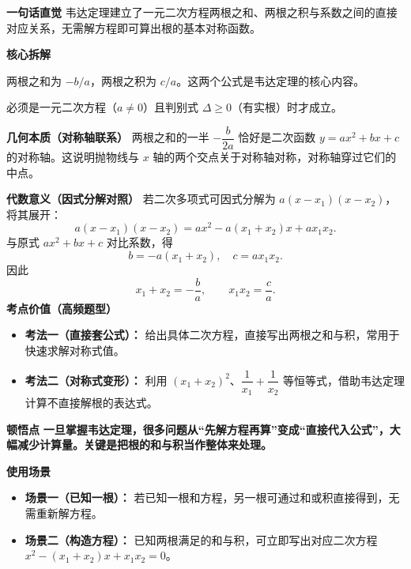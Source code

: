 \begin{explanationbox}
	\textbf{\textcolor{CExplanation}{一句话直觉}}
	韦达定理建立了一元二次方程两根之和、两根之积与系数之间的直接对应关系，无需解方程即可算出根的基本对称函数。

	\medskip
	\textbf{\textcolor{CExplanation}{核心拆解}}
	\begin{description}[style=nextline, leftmargin=2.8em, labelsep=0.5em, itemsep=0.45em]
		\item[\textbf{要点一（和积公式）：}]
			两根之和为 $-b/a$，两根之积为 $c/a$。这两个公式是韦达定理的核心内容。
		\item[\textbf{要点二（使用前提）：}]
			必须是一元二次方程（$a\neq 0$）且判别式 $\Delta\geq 0$（有实根）时才成立。
	\end{description}

	\medskip
	\textbf{\textcolor{CExplanation}{几何本质（对称轴联系）}}
	两根之和的一半 $-\dfrac{b}{2a}$ 恰好是二次函数 $y=ax^2+bx+c$ 的对称轴。这说明抛物线与 $x$ 轴的两个交点关于对称轴对称，对称轴穿过它们的中点。

	\medskip
	\textbf{\textcolor{CExplanation}{代数意义（因式分解对照）}}
	若二次多项式可因式分解为 $a(x-x_1)(x-x_2)$，将其展开：
	\[
		a(x-x_1)(x-x_2)=ax^2-a(x_1+x_2)x+a x_1x_2.
	\]
	与原式 $ax^2+bx+c$ 对比系数，得
	\[
		b=-a(x_1+x_2),\quad c=a x_1x_2.
	\]
	因此
	\[
		x_1+x_2=-\frac{b}{a},
		\qquad
		x_1x_2=\frac{c}{a}.
	\]
	\medskip
	\textbf{\textcolor{CExplanation}{考点价值（高频题型）}}
	\begin{itemize}[leftmargin=*, itemsep=0.5em, topsep=0.4em]
		\item \textbf{考法一（直接套公式）：} 给出具体二次方程，直接写出两根之和与积，常用于快速求解对称式值。
		\item \textbf{考法二（对称式变形）：} 利用 $(x_1+x_2)^2$、$\dfrac{1}{x_1}+\dfrac{1}{x_2}$ 等恒等式，借助韦达定理计算不直接解根的表达式。
	\end{itemize}

	\medskip
	\textbf{\textcolor{CExplanation}{顿悟点}}
	\textbf{一旦掌握韦达定理，很多问题从“先解方程再算”变成“直接代入公式”，大幅减少计算量。关键是把根的和与积当作整体来处理。}

	\medskip
	\textbf{\textcolor{CExplanation}{使用场景}}
	\begin{itemize}[leftmargin=*, itemsep=0.5em, topsep=0.4em]
		\item \textbf{场景一（已知一根）：} 若已知一根和方程，另一根可通过和或积直接得到，无需重新解方程。
		\item \textbf{场景二（构造方程）：} 已知两根满足的和与积，可立即写出对应二次方程 $x^2-(x_1+x_2)x+x_1x_2=0$。
	\end{itemize}

\end{explanationbox}
